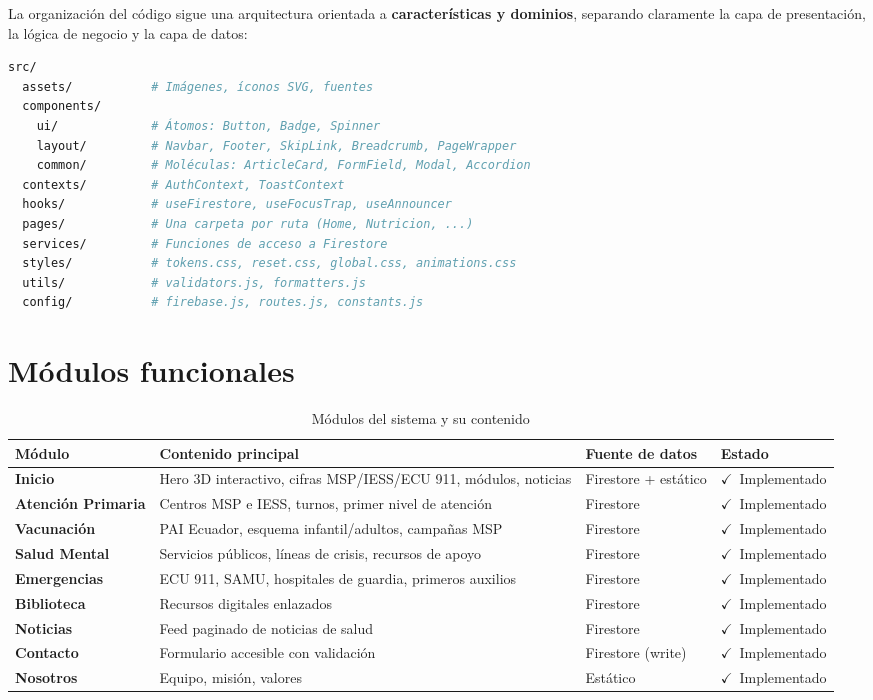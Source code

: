 \documentclass[12pt, a4paper]{report}
\newcommand{\cmark}{\textcolor{successgreen}{$\checkmark$}}
\begin{document}
La organización del código sigue una arquitectura orientada a \textbf{características y dominios}, separando claramente la capa de presentación, la lógica de negocio y la capa de datos:

\begin{lstlisting}[language=bash, caption={Estructura de directorios del proyecto}, label={lst:estructura}]
src/
  assets/           # Imágenes, íconos SVG, fuentes
  components/
    ui/             # Átomos: Button, Badge, Spinner
    layout/         # Navbar, Footer, SkipLink, Breadcrumb, PageWrapper
    common/         # Moléculas: ArticleCard, FormField, Modal, Accordion
  contexts/         # AuthContext, ToastContext
  hooks/            # useFirestore, useFocusTrap, useAnnouncer
  pages/            # Una carpeta por ruta (Home, Nutricion, ...)
  services/         # Funciones de acceso a Firestore
  styles/           # tokens.css, reset.css, global.css, animations.css
  utils/            # validators.js, formatters.js
  config/           # firebase.js, routes.js, constants.js
\end{lstlisting}

\section{Módulos funcionales}

\begin{table}[H]
\centering
\caption{Módulos del sistema y su contenido}
\label{tab:modulos}
\begin{tabular}{@{}>{\bfseries}p{3.2cm} p{5cm} >{\centering\arraybackslash}p{3cm} >{\centering\arraybackslash}p{2.5cm}@{}}
\toprule
\rowcolor{royalblue!12}
\textbf{Módulo} & \textbf{Contenido principal} & \textbf{Fuente de datos} & \textbf{Estado} \\
\midrule
Inicio           & Hero 3D interactivo, cifras MSP/IESS/ECU 911, módulos, noticias & Firestore + estático & \cmark~Implementado \\
Atención Primaria & Centros MSP e IESS, turnos, primer nivel de atención & Firestore & \cmark~Implementado \\
Vacunación       & PAI Ecuador, esquema infantil/adultos, campañas MSP & Firestore & \cmark~Implementado \\
Salud Mental     & Servicios públicos, líneas de crisis, recursos de apoyo & Firestore & \cmark~Implementado \\
Emergencias      & ECU 911, SAMU, hospitales de guardia, primeros auxilios & Firestore & \cmark~Implementado \\
Biblioteca      & Recursos digitales enlazados & Firestore & \cmark~Implementado \\
Noticias        & Feed paginado de noticias de salud & Firestore & \cmark~Implementado \\
Contacto        & Formulario accesible con validación & Firestore (write) & \cmark~Implementado \\
Nosotros        & Equipo, misión, valores & Estático & \cmark~Implementado \\
\bottomrule
\end{tabular}
\end{table}
\end{document}
